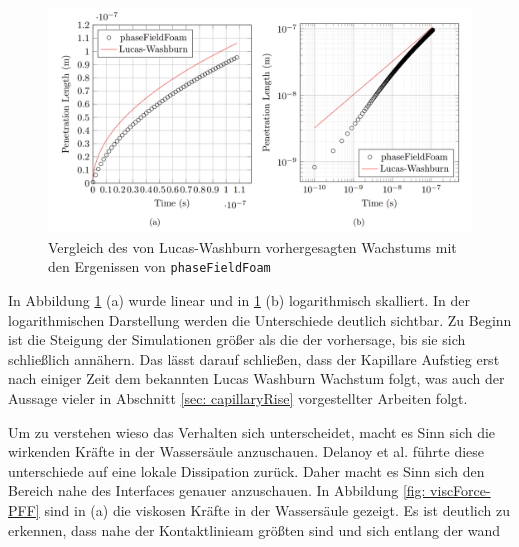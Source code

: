 \begin{figure}[h]
    \centering
    \includegraphics[width=.95\textwidth]{Pictures/LW-PFF_comp.png}
    \caption{Vergleich des von Lucas-Washburn vorhergesagten Wachstums mit den Ergenissen von \texttt{phaseFieldFoam}}
    \label{fig: LW-PFF_comp}
\end{figure}
In Abbildung \ref{fig: LW-PFF_comp} (a) wurde linear und in \ref{fig: LW-PFF_comp} (b) logarithmisch skalliert. In der logarithmischen Darstellung werden die Unterschiede deutlich sichtbar. Zu Beginn ist die Steigung der Simulationen größer als die der vorhersage, bis sie sich schließlich annähern. Das lässt darauf schließen, dass der Kapillare Aufstieg erst nach einiger Zeit dem bekannten Lucas Washburn Wachstum folgt, was auch der Aussage vieler in Abschnitt \ref{sec: capillaryRise} vorgestellter Arbeiten folgt. 

Um zu verstehen wieso das Verhalten sich unterscheidet, macht es Sinn sich die wirkenden Kräfte in der Wassersäule anzuschauen. Delanoy et al. \cite{delannoy2019DualRoleViscosity} führte diese unterschiede auf eine lokale Dissipation zurück. Daher macht es Sinn sich den Bereich nahe des Interfaces genauer anzuschauen. In Abbildung \ref{fig: viscForce-PFF} sind in (a) die viskosen Kräfte in der Wassersäule gezeigt. Es ist deutlich zu erkennen, dass nahe der Kontaktlinieam größten sind und sich entlang der wand 

